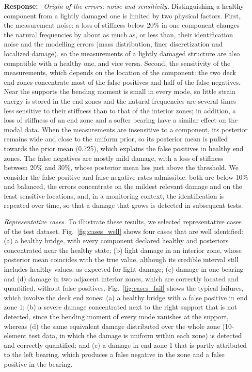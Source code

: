 \documentclass[11pt]{article}
\newenvironment{response}{\par\smallskip\noindent\color{resp}\textbf{Response:}\ }{\par}
\begin{document}
\begin{response}
\textit{Origin of the errors: noise and sensitivity.} Distinguishing a healthy component from a lightly damaged one is
limited by two physical factors. First, the measurement noise: a loss of stiffness below 20\% in one component changes
the natural frequencies by about as much as, or less than, their identification noise and the modelling errors (mass
distribution, finer discretization and localized damage), so the measurements of a lightly damaged structure are also
compatible with a healthy one, and vice versa. Second, the sensitivity of the measurements, which depends on the
location of the component: the two deck end zones concentrate most of the false positives and half of the false
negatives. Near the supports the bending moment is small in every mode, so little strain energy is
stored in the end zones and the natural frequencies are several times less sensitive to their stiffness than to that
of the interior zones; in addition, a loss of stiffness of an end zone and a softer bearing have a similar effect on the
modal data. When the measurements are
insensitive to a component, its posterior remains wide and close to the uniform prior, so its posterior mean is pulled
towards the prior mean (0.725), which explains the false positives in healthy end zones. The false negatives are mostly
mild damage, with a loss of stiffness between 20\% and 30\%, whose posterior mean lies just above the threshold. We
consider the false-positive and false-negative rates admissible: both are below 10\% and balanced, the errors
concentrate on the mildest relevant damage and on the least sensitive locations, and, in a monitoring context, the
identification is repeated over time, so that a damage that grows is detected in subsequent tests.

\textit{Representative cases.} To illustrate these results, we selected representative cases of the test dataset.
Fig.~\ref{fig:cases_well} shows four cases that are well identified: (a) a healthy bridge, with every component declared
healthy and posteriors concentrated near the healthy state; (b) light damage in an interior zone, whose posterior mean
coincides with the true value, although its credible interval still includes healthy values, as expected for light
damage; (c) damage in one bearing and (d) damage in two adjacent interior zones, which are correctly located and
quantified, without false positives. Fig.~\ref{fig:cases_fail} shows the typical failures, which involve the deck end
zones: (a) a healthy bridge with a false positive in end zone 1; (b) a severe damage concentrated next to the right
support that is not detected, since the bending moment of every mode vanishes at the support, whereas (d) the same
equivalent damage distributed over the whole zone (10-element test data, in which the damage is uniform within each
zone) is detected and correctly quantified; and (c) a damage in end
zone 1 that is partly attributed to the left bearing, which produces a false negative in the zone and a false positive
in the bearing.


\end{response}
\end{document}
